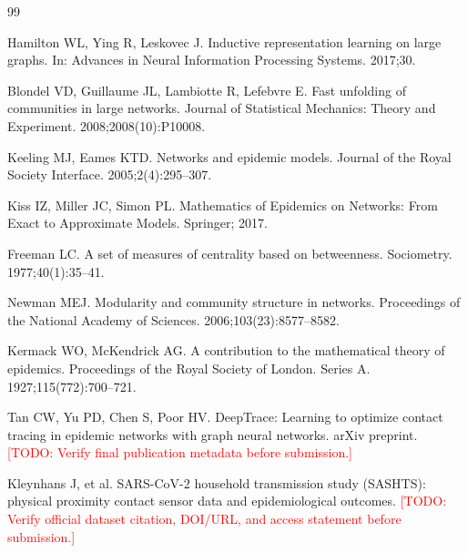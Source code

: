 \documentclass[11pt,a4paper]{article}
\newcommand{\TODO}[1]{\textcolor{red}{[TODO: #1]}}
\begin{document}
\begin{thebibliography}{99}

Hamilton WL, Ying R, Leskovec J.
Inductive representation learning on large graphs.
In: Advances in Neural Information Processing Systems. 2017;30.

Blondel VD, Guillaume JL, Lambiotte R, Lefebvre E.
Fast unfolding of communities in large networks.
Journal of Statistical Mechanics: Theory and Experiment. 2008;2008(10):P10008.

Keeling MJ, Eames KTD.
Networks and epidemic models.
Journal of the Royal Society Interface. 2005;2(4):295--307.

Kiss IZ, Miller JC, Simon PL.
Mathematics of Epidemics on Networks: From Exact to Approximate Models.
Springer; 2017.

Freeman LC.
A set of measures of centrality based on betweenness.
Sociometry. 1977;40(1):35--41.

Newman MEJ.
Modularity and community structure in networks.
Proceedings of the National Academy of Sciences. 2006;103(23):8577--8582.

Kermack WO, McKendrick AG.
A contribution to the mathematical theory of epidemics.
Proceedings of the Royal Society of London. Series A. 1927;115(772):700--721.

Tan CW, Yu PD, Chen S, Poor HV.
DeepTrace: Learning to optimize contact tracing in epidemic networks with graph neural networks.
arXiv preprint. \TODO{Verify final publication metadata before submission.}

Kleynhans J, et al.
SARS-CoV-2 household transmission study (SASHTS): physical proximity contact sensor data and epidemiological outcomes.
\TODO{Verify official dataset citation, DOI/URL, and access statement before submission.}

\end{thebibliography}
\end{document}

